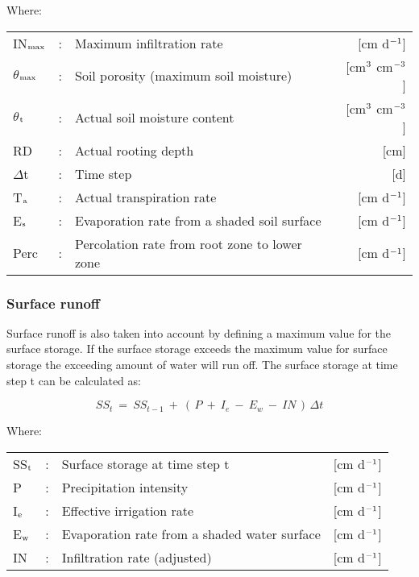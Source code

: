 Where:\\[5pt]
\begin{tabularx}{\textwidth}{llXr}
IN$_{{\rm max}}$ &:& Maximum infiltration rate  & [cm d$^{{\rm -1}}$]\\
$\theta$$_{{\rm max}}$ &:& Soil porosity (maximum soil moisture)  & [cm$^{{\rm 3}}$ cm$^{{\rm -3}}$]\\
$\theta$$_{{\rm t}}$ &:& Actual soil moisture content  & [cm$^{{\rm 3}}$ cm$^{{\rm -3}}$]\\
RD &:& Actual rooting depth  & [cm]\\
$\Delta$t &:& Time step  & [d]\\
T$_{{\rm a}}$ &:& Actual transpiration rate   & [cm d$^{{\rm -1}}$]\\
E$_{{\rm s}}$ &:& Evaporation rate from a shaded soil surface  & [cm d$^{{\rm -1}}$]\\
Perc &:& Percolation rate from root zone to lower zone  & [cm d$^{{\rm -1}}$]\\
\end{tabularx}

\subsubsection{Surface runoff}

Surface runoff is also taken into account by defining a maximum value for the surface
storage. If the surface storage exceeds the maximum value for surface storage the
exceeding amount of water will run off. The surface storage at time step t can be
calculated as:

\begin{equation}
SS_{t} ~=~ SS _{t-1} ~+~ (\, P ~+~ I _{e} ~-~ E _{w} ~-~ IN\, )\, \Delta t
\end{equation}

Where:\\[5pt]
\begin{tabularx}{\textwidth}{llXr}
SS$_{{\rm t}}$ &:& Surface storage at time step t  & [cm d$^{{\rm -1}}$]\\
P &:& Precipitation intensity  & [cm d$^{{\rm -1}}$]\\
I$_{{\rm e}}$ &:& Effective irrigation rate  & [cm d$^{{\rm -1}}$]\\
E$_{{\rm w}}$ &:& Evaporation rate from a shaded water surface  & [cm d$^{{\rm -1}}$]\\
IN &:& Infiltration rate (adjusted)  & [cm d$^{{\rm -1}}$]\\
\end{tabularx}

